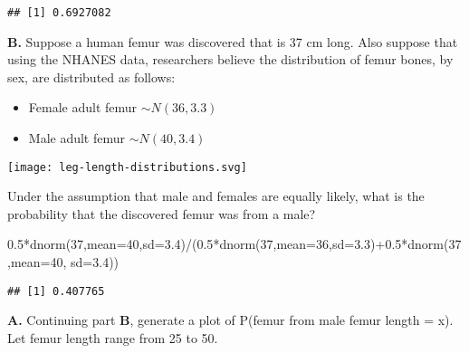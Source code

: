 \documentclass[
]{article}
\newenvironment{Shaded}{\begin{snugshade}}{\end{snugshade}}
\newcommand{\AttributeTok}[1]{\textcolor[rgb]{0.77,0.63,0.00}{#1}}
\newcommand{\DecValTok}[1]{\textcolor[rgb]{0.00,0.00,0.81}{#1}}
\newcommand{\FloatTok}[1]{\textcolor[rgb]{0.00,0.00,0.81}{#1}}
\newcommand{\FunctionTok}[1]{\textcolor[rgb]{0.00,0.00,0.00}{#1}}
\newcommand{\NormalTok}[1]{#1}
\newcommand{\SpecialCharTok}[1]{\textcolor[rgb]{0.00,0.00,0.00}{#1}}
\providecommand{\tightlist}{%
  \setlength{\itemsep}{0pt}\setlength{\parskip}{0pt}}
\begin{document}
\begin{verbatim}
## [1] 0.6927082
\end{verbatim}

\textbf{B.} Suppose a human femur was discovered that is 37 cm long.
Also suppose that using the NHANES data, researchers believe the
distribution of femur bones, by sex, are distributed as follows:

\begin{itemize}
\tightlist
\item
  Female adult femur \(\sim N(36, 3.3)\)
\item
  Male adult femur \(\sim N(40, 3.4)\)
\end{itemize}

\texttt{[image: leg-length-distributions.svg]}

Under the assumption that male and females are equally likely, what is
the probability that the discovered femur was from a male?

\begin{Shaded}
\begin{Highlighting}[]
\FloatTok{0.5}\SpecialCharTok{*}\FunctionTok{dnorm}\NormalTok{(}\DecValTok{37}\NormalTok{,}\AttributeTok{mean=}\DecValTok{40}\NormalTok{,}\AttributeTok{sd=}\FloatTok{3.4}\NormalTok{)}\SpecialCharTok{/}\NormalTok{(}\FloatTok{0.5}\SpecialCharTok{*}\FunctionTok{dnorm}\NormalTok{(}\DecValTok{37}\NormalTok{,}\AttributeTok{mean=}\DecValTok{36}\NormalTok{,}\AttributeTok{sd=}\FloatTok{3.3}\NormalTok{)}\SpecialCharTok{+}\FloatTok{0.5}\SpecialCharTok{*}\FunctionTok{dnorm}\NormalTok{(}\DecValTok{37}\NormalTok{,}\AttributeTok{mean=}\DecValTok{40}\NormalTok{, }\AttributeTok{sd=}\FloatTok{3.4}\NormalTok{))}
\end{Highlighting}
\end{Shaded}

\begin{verbatim}
## [1] 0.407765
\end{verbatim}

\textbf{A.} Continuing part \textbf{B}, generate a plot of P(femur from
male \textbar{} femur length = x). Let femur length range from 25 to 50.
\end{document}
